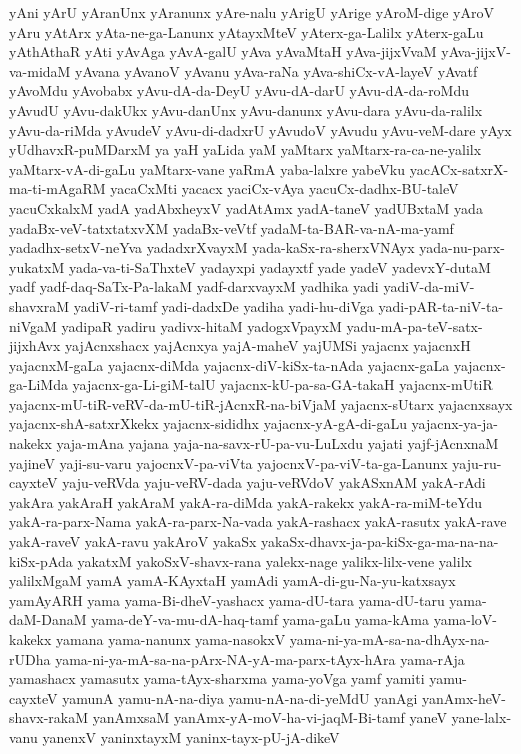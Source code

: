 {yAni
yArU
yAranUnx
yAranunx
yAre-nalu
yArigU
yArige
yAroM-dige
yAroV
yAru
yAtArx
yAta-ne-ga-Lanunx
yAtayxMteV
yAterx-ga-Lalilx
yAterx-gaLu
yAthAthaR
yAti
yAvAga
yAvA-galU
yAva
yAvaMtaH
yAva-jijxVvaM
yAva-jijxV-va-midaM
yAvana
yAvanoV
yAvanu
yAva-raNa
yAva-shiCx-vA-layeV
yAvatf
yAvoMdu
yAvobabx
yAvu-dA-da-DeyU
yAvu-dA-darU
yAvu-dA-da-roMdu
yAvudU
yAvu-dakUkx
yAvu-danUnx
yAvu-danunx
yAvu-dara
yAvu-da-ralilx
yAvu-da-riMda
yAvudeV
yAvu-di-dadxrU
yAvudoV
yAvudu
yAvu-veM-dare
yAyx
yUdhavxR-puMDarxM
ya
yaH
yaLida
yaM
yaMtarx
yaMtarx-ra-ca-ne-yalilx
yaMtarx-vA-di-gaLu
yaMtarx-vane
yaRmA
yaba-lalxre
yabeVku
yacACx-satxrX-ma-ti-mAgaRM
yacaCxMti
yacacx
yaciCx-vAya
yacuCx-dadhx-BU-taleV
yacuCxkalxM
yadA
yadAbxheyxV
yadAtAmx
yadA-taneV
yadUBxtaM
yada
yadaBx-veV-tatxtatxvXM
yadaBx-veVtf
yadaM-ta-BAR-va-nA-ma-yamf
yadadhx-setxV-neYva
yadadxrXvayxM
yada-kaSx-ra-sherxVNAyx
yada-nu-parx-yukatxM
yada-va-ti-SaThxteV
yadayxpi
yadayxtf
yade
yadeV
yadevxY-dutaM
yadf
yadf-daq-SaTx-Pa-lakaM
yadf-darxvayxM
yadhika
yadi
yadiV-da-miV-shavxraM
yadiV-ri-tamf
yadi-dadxDe
yadiha
yadi-hu-diVga
yadi-pAR-ta-niV-ta-niVgaM
yadipaR
yadiru
yadivx-hitaM
yadogxVpayxM
yadu-mA-pa-teV-satx-jijxhAvx
yajAcnxshacx
yajAcnxya
yajA-maheV
yajUMSi
yajacnx
yajacnxH
yajacnxM-gaLa
yajacnx-diMda
yajacnx-diV-kiSx-ta-nAda
yajacnx-gaLa
yajacnx-ga-LiMda
yajacnx-ga-Li-giM-talU
yajacnx-kU-pa-sa-GA-takaH
yajacnx-mUtiR
yajacnx-mU-tiR-veRV-da-mU-tiR-jAcnxR-na-biVjaM
yajacnx-sUtarx
yajacnxsayx
yajacnx-shA-satxrXkekx
yajacnx-sididhx
yajacnx-yA-gA-di-gaLu
yajacnx-ya-ja-nakekx
yaja-mAna
yajana
yaja-na-savx-rU-pa-vu-LuLxdu
yajati
yajf-jAcnxnaM
yajineV
yaji-su-varu
yajocnxV-pa-viVta
yajocnxV-pa-viV-ta-ga-Lanunx
yaju-ru-cayxteV
yaju-veRVda
yaju-veRV-dada
yaju-veRVdoV
yakASxnAM
yakA-rAdi
yakAra
yakAraH
yakAraM
yakA-ra-diMda
yakA-rakekx
yakA-ra-miM-teYdu
yakA-ra-parx-Nama
yakA-ra-parx-Na-vada
yakA-rashacx
yakA-rasutx
yakA-rave
yakA-raveV
yakA-ravu
yakAroV
yakaSx
yakaSx-dhavx-ja-pa-kiSx-ga-ma-na-na-kiSx-pAda
yakatxM
yakoSxV-shavx-rana
yalekx-nage
yalikx-lilx-vene
yalilx
yalilxMgaM
yamA
yamA-KAyxtaH
yamAdi
yamA-di-gu-Na-yu-katxsayx
yamAyARH
yama
yama-Bi-dheV-yashacx
yama-dU-tara
yama-dU-taru
yama-daM-DanaM
yama-deY-va-mu-dA-haq-tamf
yama-gaLu
yama-kAma
yama-loV-kakekx
yamana
yama-nanunx
yama-nasokxV
yama-ni-ya-mA-sa-na-dhAyx-na-rUDha
yama-ni-ya-mA-sa-na-pArx-NA-yA-ma-parx-tAyx-hAra
yama-rAja
yamashacx
yamasutx
yama-tAyx-sharxma
yama-yoVga
yamf
yamiti
yamu-cayxteV
yamunA
yamu-nA-na-diya
yamu-nA-na-di-yeMdU
yanAgi
yanAmx-heV-shavx-rakaM
yanAmxsaM
yanAmx-yA-moV-ha-vi-jaqM-Bi-tamf
yaneV
yane-lalx-vanu
yanenxV
yaninxtayxM
yaninx-tayx-pU-jA-dikeV
}
